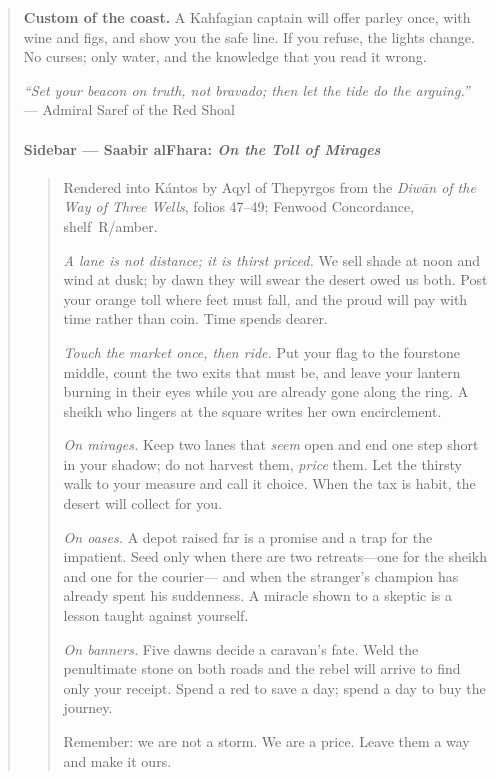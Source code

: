 \documentclass[11pt]{article}
\begin{document}
\begin{quote}
\medskip
\noindent\textbf{Custom of the coast.} A Kahfagian captain will offer parley once, with wine and figs, and show you the safe line. If you refuse, the lights change. No curses; only water, and the knowledge that you read it wrong.

\medskip
\noindent\textit{“Set your beacon on truth, not bravado; then let the tide do the arguing.”} — Admiral Saref of the Red Shoal

\clearpage

\paragraph*{Sidebar — Saabir al\textendash Fhara: \textit{On the Toll of Mirages}}
\begin{quote}\small
Rendered into Kántos by Aqyl of Thepyrgos from the \textit{Diwān of the Way of Three Wells}, folios 47–49; Fenwood Concordance, shelf~R/amber.

\medskip
\textit{A lane is not distance; it is thirst priced.} We sell shade at noon and wind at dusk; by dawn they will swear the desert owed us both. Post your orange toll where feet must fall, and the proud will pay with time rather than coin. Time spends dearer.

\medskip
\textit{Touch the market once, then ride.} Put your flag to the four\textendash stone middle, count the two exits that must be, and leave your lantern burning in their eyes while you are already gone along the ring. A sheikh who lingers at the square writes her own encirclement.

\medskip
\textit{On mirages.} Keep two lanes that \emph{seem} open and end one step short in your shadow; do not harvest them, \emph{price} them. Let the thirsty walk to your measure and call it choice. When the tax is habit, the desert will collect for you.

\medskip
\textit{On oases.} A depot raised far is a promise and a trap for the impatient. Seed only when there are two retreats—one for the sheikh and one for the courier— and when the stranger’s champion has already spent his suddenness. A miracle shown to a skeptic is a lesson taught against yourself.

\medskip
\textit{On banners.} Five dawns decide a caravan’s fate. Weld the penultimate stone on both roads and the rebel will arrive to find only your receipt. Spend a red to save a day; spend a day to buy the journey.

\medskip
Remember: we are not a storm. We are a price. Leave them a way and make it ours.
\end{quote}


\end{quote}
\end{document}
